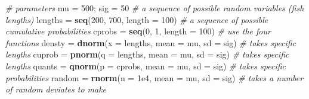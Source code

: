 \documentclass[]{book}
\newenvironment{Shaded}{\begin{snugshade}}{\end{snugshade}}
\newcommand{\KeywordTok}[1]{\textcolor[rgb]{0.13,0.29,0.53}{\textbf{#1}}}
\newcommand{\DataTypeTok}[1]{\textcolor[rgb]{0.13,0.29,0.53}{#1}}
\newcommand{\DecValTok}[1]{\textcolor[rgb]{0.00,0.00,0.81}{#1}}
\newcommand{\FloatTok}[1]{\textcolor[rgb]{0.00,0.00,0.81}{#1}}
\newcommand{\StringTok}[1]{\textcolor[rgb]{0.31,0.60,0.02}{#1}}
\newcommand{\CommentTok}[1]{\textcolor[rgb]{0.56,0.35,0.01}{\textit{#1}}}
\newcommand{\NormalTok}[1]{#1}
\theoremstyle{definition}
\theoremstyle{definition}
\theoremstyle{definition}
\theoremstyle{remark}
\begin{document}
\begin{Shaded}
\begin{Highlighting}[]
\CommentTok{# parameters}
\NormalTok{mu =}\StringTok{ }\DecValTok{500}\NormalTok{; sig =}\StringTok{ }\DecValTok{50}
\CommentTok{# a sequence of possible random variables (fish lengths)}
\NormalTok{lengths =}\StringTok{ }\KeywordTok{seq}\NormalTok{(}\DecValTok{200}\NormalTok{, }\DecValTok{700}\NormalTok{, }\DataTypeTok{length =} \DecValTok{100}\NormalTok{)}
\CommentTok{# a sequence of possible cumulative probabilities}
\NormalTok{cprobs =}\StringTok{ }\KeywordTok{seq}\NormalTok{(}\DecValTok{0}\NormalTok{, }\DecValTok{1}\NormalTok{, }\DataTypeTok{length =} \DecValTok{100}\NormalTok{)}
\CommentTok{# use the four functions}
\NormalTok{densty =}\StringTok{ }\KeywordTok{dnorm}\NormalTok{(}\DataTypeTok{x =}\NormalTok{ lengths, }\DataTypeTok{mean =}\NormalTok{ mu, }\DataTypeTok{sd =}\NormalTok{ sig)  }\CommentTok{# takes specific lengths}
\NormalTok{cuprob =}\StringTok{ }\KeywordTok{pnorm}\NormalTok{(}\DataTypeTok{q =}\NormalTok{ lengths, }\DataTypeTok{mean =}\NormalTok{ mu, }\DataTypeTok{sd =}\NormalTok{ sig)  }\CommentTok{# takes specific lengths}
\NormalTok{quants =}\StringTok{ }\KeywordTok{qnorm}\NormalTok{(}\DataTypeTok{p =}\NormalTok{ cprobs, }\DataTypeTok{mean =}\NormalTok{ mu, }\DataTypeTok{sd =}\NormalTok{ sig)   }\CommentTok{# takes specific probabilities}
\NormalTok{random =}\StringTok{ }\KeywordTok{rnorm}\NormalTok{(}\DataTypeTok{n =} \FloatTok{1e4}\NormalTok{, }\DataTypeTok{mean =}\NormalTok{ mu, }\DataTypeTok{sd =}\NormalTok{ sig)      }\CommentTok{# takes a number of random deviates to make}


\end{Highlighting}
\end{Shaded}
\end{document}
